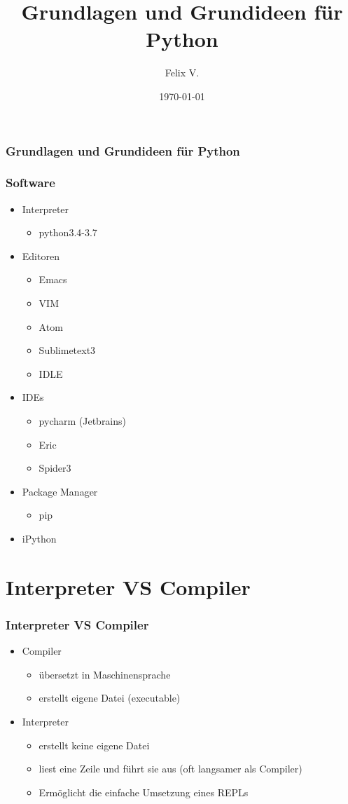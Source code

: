 \documentclass{beamer}
\title{Grundlagen und Grundideen für Python}
\author{Felix V.}
\date{\today}
\begin{document}
\begin{frame}
\titlepage
\end{frame}

\begin{frame}
  \frametitle{Grundlagen und Grundideen für Python}
  \tableofcontents
\end{frame}

\begin{frame}
  \frametitle{Software}
  \begin{itemize}
  \item<+-> Interpreter
    \begin{itemize}
      \item python3.4-3.7
    \end{itemize}
  \item<+-> Editoren
    \begin{itemize}
    \item Emacs
    \item VIM
    \item Atom
    \item Sublimetext3
    \item IDLE
    \end{itemize}
  \item<+-> IDEs
    \begin{itemize}
    \item pycharm (Jetbrains)
    \item Eric
    \item Spider3
    \end{itemize}
  \item<+-> Package Manager
    \begin{itemize}
    \item pip
    \end{itemize}
  \item<+-> iPython
  \end{itemize}
\end{frame}

\section{Interpreter VS Compiler}
\begin{frame}
  \frametitle{Interpreter VS Compiler}
  \begin{itemize}
  \item<+-> Compiler
    \begin{itemize}
    \item übersetzt in Maschinensprache
    \item erstellt eigene Datei (executable)
    \end{itemize}
  \item<+-> Interpreter
    \begin{itemize}
    \item erstellt keine eigene Datei
    \item liest eine Zeile und führt sie aus (oft langsamer als Compiler)
    \item Ermöglicht die einfache Umsetzung eines REPLs
    \end{itemize}
  \end{itemize}
\end{frame}
\end{document}

